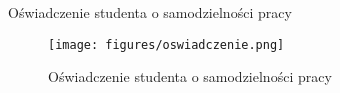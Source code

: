 \chapter*{}
\label{cha:statement-A}

\begin{center}
    \normalsize Oświadczenie studenta o samodzielności pracy
\end{center}

\vspace{1em} 

\begin{figure}[H]
    \centering
    \texttt{[image: figures/oswiadczenie.png]}
    \caption{Oświadczenie studenta o samodzielności pracy}
    \label{fig:Skan}
\end{figure}